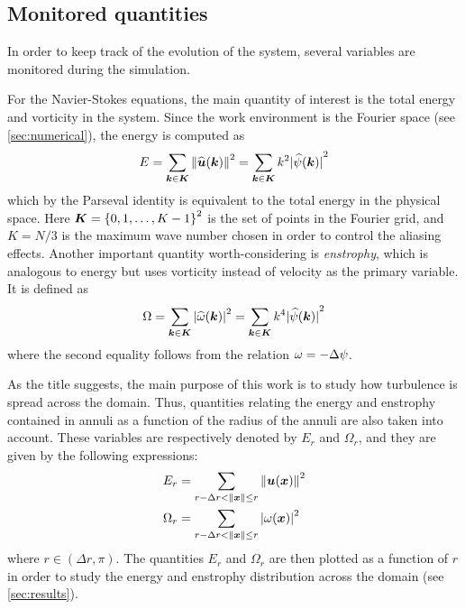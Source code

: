 \documentclass[../main.tex]{subfiles}
\begin{document}
\subsection{Monitored quantities}
In order to keep track of the evolution of the system, several variables are monitored during the simulation.

For the Navier-Stokes equations, the main quantity of interest is the total energy and vorticity in the system. Since the work environment is the Fourier space (see \cref{sec:numerical}), the energy is computed as
\begin{equation}
	E = \sum_{\boldsymbol{k}\in\boldsymbol{K}} \left\|\widehat{\boldsymbol{u}}(\boldsymbol{k})\right\|^2 = \sum_{\boldsymbol{k}\in\boldsymbol{K}} k^2 {|\widehat{\psi}(\boldsymbol{k})|}^2
\end{equation}
which by the Parseval identity is equivalent to the total energy in the physical space. Here $\boldsymbol{K} = {\{0,1,\ldots,K-1\}}^2$ is the set of points in the Fourier grid, and $K=N/3$ is the maximum wave number chosen in order to control the aliasing effects. Another important quantity worth-considering is \emph{enstrophy}, which is analogous to energy but uses vorticity instead of velocity as the primary variable. It is defined as
\begin{equation}
	\Omega = \sum_{\boldsymbol{k}\in\boldsymbol{K}} {|\widehat{\omega}(\boldsymbol{k})|}^2 = \sum_{\boldsymbol{k}\in\boldsymbol{K}} k^4 {|\widehat{\psi}(\boldsymbol{k})|}^2
\end{equation}
where the second equality follows from the relation $\omega = -\Delta \psi$.

As the title suggests, the main purpose of this work is to study how turbulence is spread across the domain. Thus, quantities relating the energy and enstrophy contained in annuli as a function of the radius of the annuli are also taken into account. These variables are respectively denoted by $E_r$ and $\Omega_r$, and they are given by the following expressions:
\begin{align}
	E_r      & = \sum_{r-\Delta r<\left\|\boldsymbol{x}\right\|\leq r} \left\|{\boldsymbol{u}}(\boldsymbol{x})\right\|^2  \\
	\Omega_r & = \sum_{r-\Delta r<\left\|\boldsymbol{x}\right\|\leq r} \abs{{{\omega}}(\boldsymbol{x})}^2
\end{align}
where $r\in (\Delta r, \pi)$. The quantities $E_r$ and $\Omega_r$ are then plotted as a function of $r$ in order to study the energy and enstrophy distribution across the domain (see \cref{sec:results}).
\end{document}
